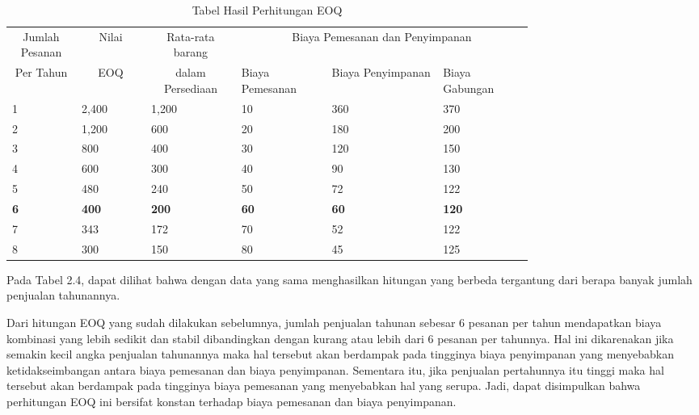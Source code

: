 \begin{table}[h!]
	\caption{Tabel Hasil Perhitungan EOQ}
	\label{tab:table4}
	\begin{tabular}{|m{0.1\linewidth}|m{0.1\linewidth}|m{0.13\linewidth}|m{0.13\linewidth}|m{0.16\linewidth}|m{0.13\linewidth}|} %
	\hline
	\multicolumn{1}{|c|}{Jumlah Pesanan} & \multicolumn{1}{|c|}{Nilai} & \multicolumn{1}{|c|}{Rata-rata barang} & \multicolumn{3}{c|}{Biaya Pemesanan dan Penyimpanan} \\
	\cline{4-6}
	\multicolumn{1}{|c|}{Per Tahun} & \multicolumn{1}{|c|}{EOQ} & \multicolumn{1}{|c|}{dalam Persediaan} & Biaya Pemesanan & Biaya Penyimpanan & Biaya Gabungan \\
	\hline
		1 & 2,400 & 1,200 & 10 & 360 & 370\\ \hline
		2 & 1,200 & 600 & 20 & 180 & 200\\ \hline
		3 & 800 & 400 & 30 & 120 & 150\\ \hline
		4 & 600 & 300 & 40 & 90 & 130\\ \hline
		5 & 480 & 240 & 50 & 72 & 122\\ \hline
		\textbf{6} & \textbf{400} & \textbf{200} & \textbf{60} & \textbf{60} & \textbf{120}\\ \hline
		7 & 343 & 172 & 70 & 52 & 122\\ \hline
		8 & 300 & 150 & 80 & 45 & 125\\ \hline
	\end{tabular}
\end{table}


Pada Tabel 2.4, dapat dilihat bahwa dengan data yang sama menghasilkan hitungan yang berbeda tergantung dari berapa banyak jumlah penjualan tahunannya.

Dari hitungan EOQ yang sudah dilakukan sebelumnya, jumlah penjualan tahunan sebesar 6 pesanan per tahun mendapatkan biaya kombinasi yang lebih sedikit dan stabil dibandingkan dengan kurang atau lebih dari 6 pesanan per tahunnya. Hal ini dikarenakan jika semakin kecil angka penjualan tahunannya maka hal tersebut akan berdampak pada tingginya biaya penyimpanan yang menyebabkan ketidakseimbangan antara biaya pemesanan dan biaya penyimpanan. Sementara itu, jika penjualan pertahunnya itu tinggi maka hal tersebut akan berdampak pada tingginya biaya pemesanan yang menyebabkan hal yang serupa. Jadi, dapat disimpulkan bahwa perhitungan EOQ ini bersifat konstan terhadap biaya pemesanan dan biaya penyimpanan.


